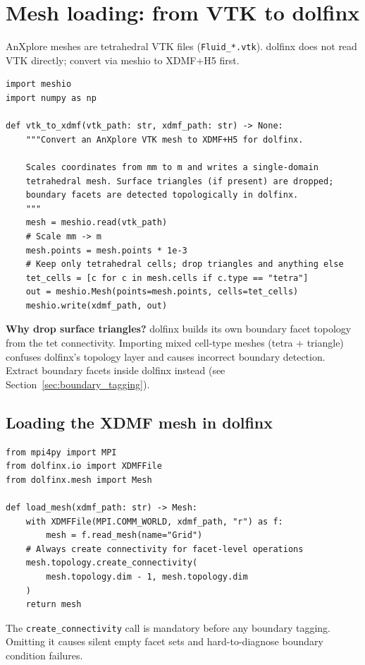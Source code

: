 \documentclass[11pt]{article}
\begin{document}
\section{Mesh loading: from VTK to dolfinx}

AnXplore meshes are tetrahedral VTK files (\texttt{Fluid\_*.vtk}).
dolfinx does not read VTK directly; convert via meshio to XDMF+H5 first.

\begin{lstlisting}
import meshio
import numpy as np

def vtk_to_xdmf(vtk_path: str, xdmf_path: str) -> None:
    """Convert an AnXplore VTK mesh to XDMF+H5 for dolfinx.

    Scales coordinates from mm to m and writes a single-domain
    tetrahedral mesh. Surface triangles (if present) are dropped;
    boundary facets are detected topologically in dolfinx.
    """
    mesh = meshio.read(vtk_path)
    # Scale mm -> m
    mesh.points = mesh.points * 1e-3
    # Keep only tetrahedral cells; drop triangles and anything else
    tet_cells = [c for c in mesh.cells if c.type == "tetra"]
    out = meshio.Mesh(points=mesh.points, cells=tet_cells)
    meshio.write(xdmf_path, out)
\end{lstlisting}

\textbf{Why drop surface triangles?} dolfinx builds its own boundary
facet topology from the tet connectivity. Importing mixed cell-type meshes
(tetra + triangle) confuses dolfinx's topology layer and causes incorrect
boundary detection. Extract boundary facets inside dolfinx instead
(see Section~\ref{sec:boundary_tagging}).

\subsection*{Loading the XDMF mesh in dolfinx}

\begin{lstlisting}
from mpi4py import MPI
from dolfinx.io import XDMFFile
from dolfinx.mesh import Mesh

def load_mesh(xdmf_path: str) -> Mesh:
    with XDMFFile(MPI.COMM_WORLD, xdmf_path, "r") as f:
        mesh = f.read_mesh(name="Grid")
    # Always create connectivity for facet-level operations
    mesh.topology.create_connectivity(
        mesh.topology.dim - 1, mesh.topology.dim
    )
    return mesh
\end{lstlisting}

The \texttt{create\_connectivity} call is mandatory before any boundary
tagging. Omitting it causes silent empty facet sets and hard-to-diagnose
boundary condition failures.
\end{document}
